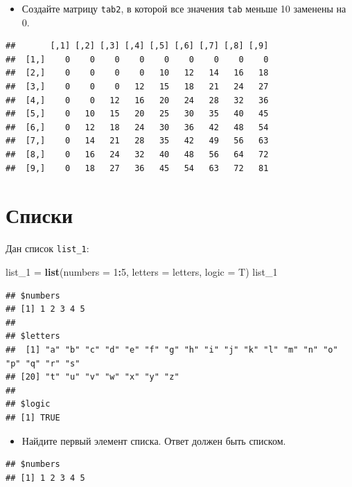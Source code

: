 \documentclass[]{book}
\newenvironment{Shaded}{\begin{snugshade}}{\end{snugshade}}
\newcommand{\KeywordTok}[1]{\textcolor[rgb]{0.13,0.29,0.53}{\textbf{#1}}}
\newcommand{\DataTypeTok}[1]{\textcolor[rgb]{0.13,0.29,0.53}{#1}}
\newcommand{\DecValTok}[1]{\textcolor[rgb]{0.00,0.00,0.81}{#1}}
\newcommand{\StringTok}[1]{\textcolor[rgb]{0.31,0.60,0.02}{#1}}
\newcommand{\OperatorTok}[1]{\textcolor[rgb]{0.81,0.36,0.00}{\textbf{#1}}}
\newcommand{\NormalTok}[1]{#1}
\providecommand{\tightlist}{%
  \setlength{\itemsep}{0pt}\setlength{\parskip}{0pt}}
\begin{document}
\begin{itemize}
\tightlist
\item
  Создайте матрицу \texttt{tab2}, в которой все значения \texttt{tab}
  меньше 10 заменены на 0.
\end{itemize}

\begin{verbatim}
##       [,1] [,2] [,3] [,4] [,5] [,6] [,7] [,8] [,9]
##  [1,]    0    0    0    0    0    0    0    0    0
##  [2,]    0    0    0    0   10   12   14   16   18
##  [3,]    0    0    0   12   15   18   21   24   27
##  [4,]    0    0   12   16   20   24   28   32   36
##  [5,]    0   10   15   20   25   30   35   40   45
##  [6,]    0   12   18   24   30   36   42   48   54
##  [7,]    0   14   21   28   35   42   49   56   63
##  [8,]    0   16   24   32   40   48   56   64   72
##  [9,]    0   18   27   36   45   54   63   72   81
\end{verbatim}

\section{Списки}\label{list_ta}

Дан список \texttt{list\_1}:

\begin{Shaded}
\begin{Highlighting}[]
\NormalTok{list_}\DecValTok{1}\NormalTok{ =}\StringTok{ }\KeywordTok{list}\NormalTok{(}\DataTypeTok{numbers =} \DecValTok{1}\OperatorTok{:}\DecValTok{5}\NormalTok{, }\DataTypeTok{letters =}\NormalTok{ letters, }\DataTypeTok{logic =}\NormalTok{ T)}
\NormalTok{list_}\DecValTok{1}
\end{Highlighting}
\end{Shaded}

\begin{verbatim}
## $numbers
## [1] 1 2 3 4 5
## 
## $letters
##  [1] "a" "b" "c" "d" "e" "f" "g" "h" "i" "j" "k" "l" "m" "n" "o" "p" "q" "r" "s"
## [20] "t" "u" "v" "w" "x" "y" "z"
## 
## $logic
## [1] TRUE
\end{verbatim}

\begin{itemize}
\tightlist
\item
  Найдите первый элемент списка. Ответ должен быть списком.
\end{itemize}

\begin{verbatim}
## $numbers
## [1] 1 2 3 4 5
\end{verbatim}
\end{document}
